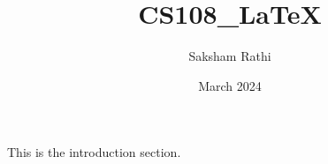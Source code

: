 \documentclass{article}
\title{CS108\_LaTeX}
\author{Saksham Rathi}
\date{March 2024}
\begin{document}
\maketitle

This is the introduction section.

\end{document}
